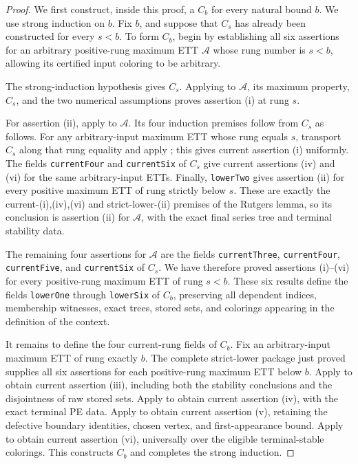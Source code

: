 \begin{proof}
We first construct, inside this proof, a
 \(C_b\) for every natural bound \(b\).
We use strong induction on \(b\).  Fix \(b\), and suppose that \(C_s\) has
already been constructed for every \(s<b\).  To form \(C_b\), begin by
establishing all six assertions for an arbitrary positive-rung maximum ETT
\(\mathcal A\) whose rung number is \(s<b\), allowing its certified input
coloring to be arbitrary.

The strong-induction hypothesis gives \(C_s\).  Applying
 to \(\mathcal A\), its
maximum property, \(C_s\), and the two numerical assumptions proves
assertion (i) at rung \(s\).

For assertion (ii), apply
 to \(\mathcal A\).  Its
four induction premises follow from \(C_s\) as follows.  For any
arbitrary-input maximum ETT whose rung equals \(s\), transport \(C_s\)
along that rung equality and apply
; this gives current
assertion (i) uniformly.  The fields \texttt{currentFour} and
\texttt{currentSix} of \(C_s\) give current assertions (iv) and (vi) for
the same arbitrary-input ETTs.  Finally, \texttt{lowerTwo} gives assertion
(ii) for every positive maximum ETT of rung strictly below \(s\).  These
are exactly the current-(i),(iv),(vi) and strict-lower-(ii) premises of the
Rutgers lemma, so its conclusion is assertion (ii) for \(\mathcal A\),
with the exact final series tree and terminal stability data.

The remaining four assertions for \(\mathcal A\) are the fields
\texttt{currentThree}, \texttt{currentFour}, \texttt{currentFive}, and
\texttt{currentSix} of \(C_s\).  We have therefore proved assertions
(i)--(vi) for every positive-rung maximum ETT of rung \(s<b\).  These six
results define the fields \texttt{lowerOne} through \texttt{lowerSix} of
\(C_b\), preserving all dependent indices, membership witnesses, exact
trees, stored sets, and colorings appearing in the definition of the
context.

It remains to define the four current-rung fields of \(C_b\).  Fix an
arbitrary-input maximum ETT of rung exactly \(b\).  The complete
strict-lower package just proved supplies all six assertions for each
positive-rung maximum ETT below \(b\).  Apply
 to obtain current assertion (iii), including
both the stability conclusions and the disjointness of raw stored sets.
Apply  to obtain current assertion (iv), with the
exact terminal PE data.  Apply  to obtain current
assertion (v), retaining the defective boundary identities, chosen
vertex, and first-appearance bound.  Apply  to obtain current
assertion (vi), universally over the eligible terminal-stable colorings.
This constructs \(C_b\) and completes the strong induction.


\end{proof}
